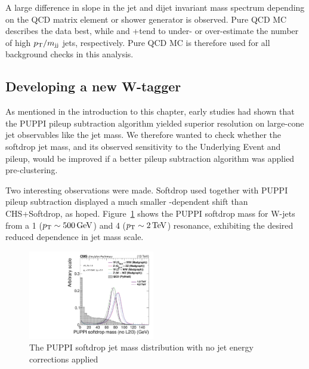 A large difference in slope in the jet \PT and dijet invariant mass spectrum depending on the QCD matrix element or shower generator is observed. Pure \PYTHIA QCD MC describes the data best, while \HERWIG{++} and \amcatnlo{}+\PYTHIA tend to under- or over-estimate the number of high $p_{\mathrm{T}}/m_\mathrm{jj}$ jets, respectively. Pure \PYTHIA QCD MC is therefore used for all background checks in this analysis.


\subsection{Developing a new W-tagger}
\label{sec:searchII:puppisoftdrop}
As mentioned in the introduction to this chapter, early studies had shown that the PUPPI pileup subtraction algorithm yielded superior resolution on large-cone jet observables like the jet mass. We therefore wanted to check whether the softdrop jet mass, and its observed sensitivity to the Underlying Event and pileup, would be improved if a better pileup subtraction algorithm was applied pre-clustering.\par
Two interesting observations were made. Softdrop used together with PUPPI pileup subtraction displayed a much smaller \PT-dependent shift than CHS+Softdrop, as hoped. Figure~\ref{fig:searchII:sdmass} shows the PUPPI softdrop mass for W-jets from a 1 \TeV ($p_{\mathrm{T}}\sim 500 \,\text{Ge\hspace{-.08em}V}$) and 4 \TeV ($p_{\mathrm{T}}\sim 2 \,\text{Te\hspace{-.08em}V}$) resonance, exhibiting the desired reduced \PT dependence in jet mass scale. 

\begin{figure}[htb]
\centering
\includegraphics[width=0.49\textwidth]{figures/analysis/search2/AN-16-235/plots/gen_SoftdropMassUnCorr.pdf}
\caption{The  PUPPI softdrop jet mass distribution with no jet energy corrections applied}
\label{fig:searchII:sdmass}
\end{figure}

